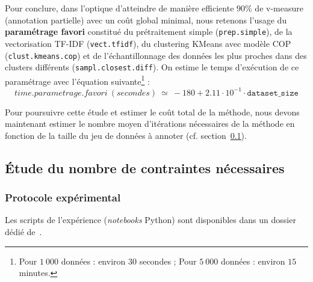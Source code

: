 			Pour conclure, dans l'optique d'atteindre de manière efficiente $90$\% de v-measure (annotation partielle) avec un coût global minimal, nous retenons l'usage du \textbf{paramétrage favori} constitué du prétraitement simple (\texttt{prep.simple}), de la vectorisation TF-IDF (\texttt{vect.tfidf}), du clustering KMeans avec modèle COP (\texttt{clust.kmeans.cop}) et de l'échantillonnage des données les plus proches dans des clusters différents (\texttt{sampl.closest.diff}).
			On estime le temps d'exécution de ce paramétrage avec l'équation suivante\footnote{Pour $1~000$ données : environ $30$ secondes ; Pour $5~000$ données : environ $15$ minutes.} :
			\begin{equation}
				time.parametrage.favori~(secondes)~
				\simeq~-180 + 2.11 \cdot 10^{-1} \cdot \texttt{dataset\_size}
			\end{equation}
			
			Pour poursuivre cette étude et estimer le coût total de la méthode, nous devons maintenant estimer le nombre moyen d'itérations nécessaires de la méthode en fonction de la taille du jeu de données à annoter (cf. section~\ref{section:4.3.3-ETUDE-COUT-NOMBRE-CONTRAINTES}).
	
	\subsection{Étude du nombre de contraintes nécessaires}
	\label{section:4.3.3-ETUDE-COUT-NOMBRE-CONTRAINTES}
	
		\subsubsection{Protocole expérimental}


			\begin{leftBarInformation}
				Les scripts de l'expérience (\textit{notebooks} Python) sont disponibles dans un dossier dédié de~\cite{schild:cognitivefactory-interactive-clustering-comparative-study:2021}.
			\end{leftBarInformation}

